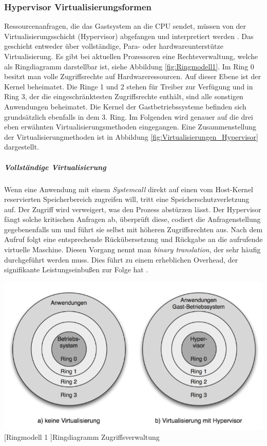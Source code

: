 \subsubsection{Hypervisor Virtualisierungsformen}
 Ressourcenanfragen, die das Gastsystem an die CPU sendet, müssen von der Virtualisierungsschicht (Hypervisor) abgefangen und interpretiert werden \cite{Meinel2011VirtualisierungMarktubersicht}. Das geschieht entweder über vollständige, Para- oder hardwareunterstütze Virtualisierung.  Es gibt bei aktuellen Prozessoren eine Rechteverwaltung, welche als Ringdiagramm darstellbar ist, siehe Abbildung \ref{fig:Ringmodell1}. Im Ring 0 besitzt man volle Zugriffsrechte auf Hardwareressourcen. Auf dieser Ebene ist der Kernel beheimatet. Die Ringe 1 und 2 stehen für Treiber zur Verfügung und in Ring 3, der die eingeschränktesten Zugriffsrechte enthält, sind alle sonstigen Anwendungen beheimatet. Die Kernel der Gastbetriebssysteme befinden sich grundsätzlich ebenfalls in dem 3. Ring. Im Folgenden wird genauer auf die drei eben erwähnten Virtualisierungsmethoden eingegangen. Eine Zusammenstellung der Virtualisierungmethoden ist in Abbildung \ref{fig:Virtualisierungen_Hypervisor} dargestellt.

\subparagraph{Vollständige Virtualisierung}
 Wenn eine Anwendung mit einem \emph{Systemcall} direkt auf einen vom Host-Kernel reservierten Speicherbereich zugreifen will, tritt eine Speicherschutzverletzung auf. Der Zugriff wird verweigert, was den Prozess abstürzen lässt. Der Hypervisor fängt solche kritischen Anfragen ab, überprüft diese, codiert die Anfragenstellung gegebenenfalls um und führt sie selbst mit höheren Zugriffsrechten aus. Nach dem Aufruf folgt eine entsprechende Rückübersetzung und Rückgabe an die aufrufende virtuelle Maschine. Diesen Vorgang nennt man \emph{binary translation}, der sehr häufig durchgeführt werden muss. Dies führt zu einem erheblichen Overhead, der signifikante Leistungseinbußen zur Folge hat \cite{Meinel2011VirtualisierungMarktubersicht}. 
 
 \vspace{1em}
\begin{minipage}{\linewidth}
	\centering
	\includegraphics[width=1\linewidth]{pics/Ringmodell1.PNG}
	[Ringmodell 1 ]{Ringdiagramm Zugriffsverwaltung \cite{Meinel2011VirtualisierungMarktubersicht} }
	\label{fig:Ringmodell1}
\end{minipage}
 
